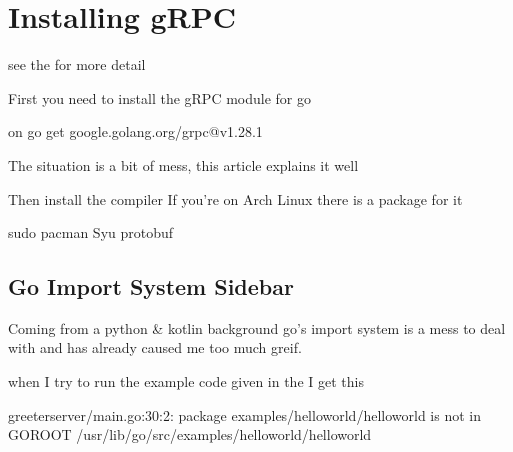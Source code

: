 \documentclass[letterpaper,10pt,english]{sphinxmanual}
\begin{document}
\section{Installing gRPC}
\label{\detokenize{grpc/grpc:installing-grpc}}
see the  for more detail

First you need to install the gRPC module for go
\def\sphinxLiteralBlockLabel{\label{\detokenize{grpc/grpc:id1}}}
\begin{sphinxVerbatim}[commandchars=\\\{\}]
\PYGZdl{}  on 
\PYGZdl{} go get google.golang.org/grpc@v1.28.1
\end{sphinxVerbatim}

The  situation is a bit of mess, this article explains it well

Then install the  compiler
If you’re on Arch Linux there is a package for it
\def\sphinxLiteralBlockLabel{\label{\detokenize{grpc/grpc:id2}}}
\begin{sphinxVerbatim}[commandchars=\\\{\}]
\PYGZdl{} sudo pacman \PYGZhy{}Syu protobuf
\end{sphinxVerbatim}


\subsection{Go Import System Sidebar}
\label{\detokenize{grpc/grpc:go-import-system-sidebar}}
 Coming from a python \& kotlin background go’s import system is
a mess to deal with and has already caused me too much greif.

when I try to run the example code given in the  I get this
\def\sphinxLiteralBlockLabel{\label{\detokenize{grpc/grpc:id3}}}
\begin{sphinxVerbatim}[commandchars=\\\{\}]
greeter\PYGZus{}server/main.go:30:2: package examples/helloworld/helloworld is not in GOROOT /usr/lib/go/src/examples/helloworld/helloworld
\end{sphinxVerbatim}
\end{document}
